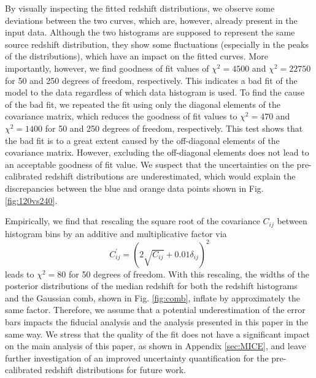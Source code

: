 \documentclass{aa}
\newcommand{\eq}[1]{\begin{equation}  #1 \end{equation}}
\begin{document}
\begin{appendix}
By visually inspecting the fitted redshift distributions, we observe some deviations between the two curves, which are, however, already present in the input data. Although the two histograms are supposed to represent the same source redshift distribution, they show some fluctuations (especially in the peaks of the distributions), which have an impact on the fitted curves. More importantly, however, we find goodness of fit values of $\chi^2 = 4500$ and $\chi^2 = 22750$ for 50 and 250 degrees of freedom, respectively. This indicates a bad fit of the model to the data regardless of which data histogram is used. To find the cause of the bad fit, we repeated the fit using only the diagonal elements of the covariance matrix, which reduces the goodness of fit values to $\chi^2 = 470$ and $\chi^2 = 1400$ for 50 and 250 degrees of freedom, respectively. This test shows that the bad fit is to a great extent caused by the off-diagonal elements of the covariance matrix. However, excluding the off-diagonal elements does not lead to an acceptable goodness of fit value. We suspect that the uncertainties on the pre-calibrated redshift distributions are underestimated, which would explain the discrepancies between the blue and orange data points shown in Fig. \ref{fig:120vs240}.

Empirically, we find that rescaling the square root of the covariance $C_{ij}$ between histogram bins by an additive and multiplicative factor via
\eq{
C^\prime_{ij} = \left(2\sqrt{C_{ij}}+0.01\delta_{ij}\right)^2
}
leads to $\chi^2 = 80$ for 50 degrees of freedom. With this rescaling, the widths of the posterior distributions of the median redshift for both the redshift histograms and the Gaussian comb, shown in Fig. \ref{fig:comb}, inflate by approximately the same factor. Therefore, we assume that a potential underestimation of the error bars impacts the fiducial analysis and the analysis presented in this paper in the same way. We stress that the quality of the fit does not have a significant impact on the main analysis of this paper, as shown in Appendix \ref{sec:MICE}, and leave further investigation of an improved uncertainty quantification for the pre-calibrated redshift distributions for future work.

\end{appendix}
\end{document}

